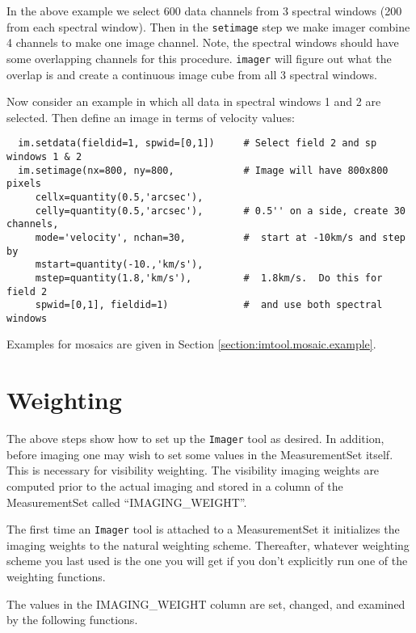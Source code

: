In the above example we select 600 data channels from 3 spectral
windows (200 from each spectral window). Then in the {\tt setimage}
step we make imager combine 4 channels to make one image channel.
Note, the spectral windows should have some overlapping channels for
this procedure.  {\tt imager} will figure out what the overlap is and
create a continuous image cube from all 3 spectral windows.

Now consider an example in which all data in spectral windows 1 and 2
are selected.  Then define an image in terms of velocity values:

\small
\begin{verbatim}
  im.setdata(fieldid=1, spwid=[0,1])     # Select field 2 and sp windows 1 & 2
  im.setimage(nx=800, ny=800,            # Image will have 800x800 pixels
     cellx=quantity(0.5,'arcsec'),
     celly=quantity(0.5,'arcsec'),       # 0.5'' on a side, create 30 channels,
     mode='velocity', nchan=30,          #  start at -10km/s and step by
     mstart=quantity(-10.,'km/s'),
     mstep=quantity(1.8,'km/s'),         #  1.8km/s.  Do this for field 2
     spwid=[0,1], fieldid=1)             #  and use both spectral windows
\end{verbatim}
\normalsize

Examples for mosaics are given in Section
\ref{section:imtool.mosaic.example}. 

\section{Weighting}
\label{section:imtool.weight}

The above steps show how to set up the {\tt Imager} tool as desired.  In
addition, before imaging one may wish to set some values in the
MeasurementSet itself.  This is necessary for visibility weighting.  The
visibility imaging weights are computed prior to the actual imaging and
stored in a column of the MeasurementSet called ``IMAGING\_WEIGHT''.

The first time an {\tt Imager} tool is attached to a MeasurementSet it
initializes the imaging weights to the natural weighting scheme.
Thereafter, whatever weighting scheme you last used is the one you
will get if you don't explicitly run one of the weighting functions.

The values in the IMAGING\_WEIGHT column are set, changed, and
examined by the following functions.

